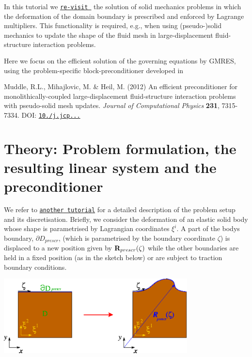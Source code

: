 In this tutorial we \href{../../../solid/prescribed_displ_lagr_mult/html/index.html}{\tt re-\/visit } the solution of solid mechanics problems in which the deformation of the domain boundary is prescribed and enforced by Lagrange multipliers. This functionality is required, e.\+g., when using (pseudo-\/)solid mechanics to update the shape of the fluid mesh in large-\/displacement fluid-\/structure interaction problems.

Here we focus on the efficient solution of the governing equations by G\+M\+R\+ES, using the problem-\/specific block-\/preconditioner developed in \begin{center} Muddle, R.\+L., Mihajlovic, M. \& Heil, M. (2012) An efficient preconditioner for monolithically-\/coupled large-\/displacement fluid-\/structure interaction problems with pseudo-\/solid mesh updates. {\itshape Journal of Computational Physics} {\bfseries 231}, 7315-\/7334. D\+OI\+: \href{http://dx.doi.org/10.1016/j.jcp.2012.07.001}{\tt 10./j.jcp...} \end{center} 



 

\hypertarget{index_model}{}\section{Theory\+: Problem formulation, the resulting linear system and the preconditioner}\label{index_model}
We refer to \href{../../../solid/prescribed_displ_lagr_mult/html/index.html}{\tt another tutorial} for a detailed description of the problem setup and its discretisation. Briefly, we consider the deformation of an elastic solid body whose shape is parametrised by Lagrangian coordinates $ \xi^i $. A part of the body\textquotesingle{}s boundary, $ \partial D_{prescr}$, (which is parametrised by the boundary coordinate $ \zeta$) is displaced to a new position given by $ {\bf R}_{prescr}(\zeta) $ while the other boundaries are held in a fixed position (as in the sketch below) or are subject to traction boundary conditions.

 
\begin{DoxyImage}
\includegraphics[width=0.75\textwidth]{sketch}
\end{DoxyImage}


